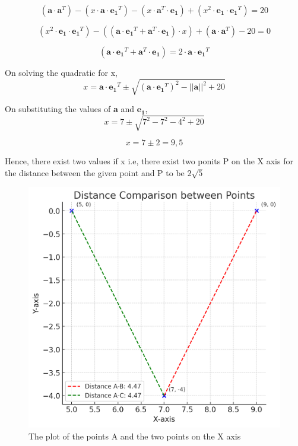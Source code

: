 \documentclass{beamer}
\theoremstyle{remark}
\numberwithin{equation}{section}
\begin{document}
\begin{frame}
\begin{equation}
(\textbf{a}\cdot \textbf{a}^T) - (x\cdot \textbf{a}\cdot \mathbf{e_1}^T) - (x\cdot \textbf{a}^T\cdot \mathbf{e_1}) + (x^2\cdot \mathbf{e_1}\cdot \mathbf{e_1}^T) = 20
\end{equation}

\begin{equation}
(x^2\cdot \mathbf{e_1}\cdot \mathbf{e_1}^T) - ((\textbf{a}\cdot \mathbf{e_1}^T + \textbf{a}^T\cdot \mathbf{e_1} )\cdot x) + (\textbf{a}\cdot \textbf{a}^T) - 20 = 0
\end{equation}

\begin{equation}
(\textbf{a}\cdot \mathbf{e_1}^T + \textbf{a}^T\cdot \mathbf{e_1} ) = 2\cdot \textbf{a}\cdot \mathbf{e_1}^T
\end{equation}

    \noindent On solving the quadratic for x, 
\begin{equation}
x = \textbf{a}\cdot \mathbf{e_1}^T \pm \sqrt{(\textbf{a}\cdot \mathbf{e_1}^T)^2 - ||\textbf{a}||^2 + 20}
\end{equation}

    \noindent On substituting the values of \textbf{a} and $\mathbf{e_1}$,
\begin{equation}
x = 7 \pm \sqrt{7^2 - 7^2 - 4^2 + 20}
\end{equation}
\end{frame}

\begin{frame}
\begin{equation}
x = 7 \pm 2 = 9 , 5
\end{equation}

   \noindent Hence, there exist two values if x i.e, there exist two ponits P on the X axis for the distance between the given point and P to be $2\sqrt{5}$ 

\begin{figure}[h]
    \centering
    \includegraphics[width=0.5\linewidth]{figs/image.png}
    \caption{The plot of the points A and the two points on the X axis}
\end{figure}
\end{frame}
\end{document}
